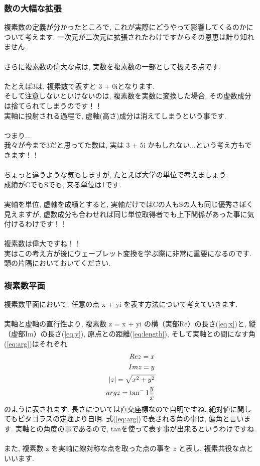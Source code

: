 \documentclass[11pt,a4paper]{jsarticle}
\begin{document}
\subsubsection{数の大幅な拡張}
複素数の定義が分かったところで, これが実際にどうやって影響してくるのかについて考えます. 一次元が二次元に拡張されたわけですからその恩恵は計り知れません. \\
\\
さらに複素数の偉大な点は, 実数を複素数の一部として扱える点です.\\
\\
たとえば3は, 複素数で表すと 3 + 0iとなります.\\
そして注意しないといけないのは, 複素数を実数に変換した場合, その虚数成分は捨てられてしまうのです！！\\
実軸に投射される過程で, 虚軸(高さ)成分は消えてしまうという事です.\\
\\
つまり...\\
我々が今まで3だと思ってた数は, 実は 3 + 5i かもしれない...という考え方もできます！！\\
\\
ちょっと違うような気もしますが, たとえば大学の単位で考えましょう.\\
成績がCでもSでも, 来る単位は1です.\\
\\
実軸を単位, 虚軸を成績とすると, 実軸だけではCの人もSの人も同じ優秀さぽく見えますが, 虚数成分も合わせれば同じ単位取得者でも上下関係があった事に気付けるわけです！！\\
\\
複素数は偉大ですね！！
\\
実はこの考え方が後にウェーブレット変換を学ぶ際に非常に重要になるのです. 頭の片隅においておいてください.\\

\subsubsection{複素数平面}
複素数平面において, 任意の点 x + yi を表す方法について考えていきます. \\
\\
実軸と虚軸の直行性より, 複素数 z = x + yi の横（実部Re）の長さ(\ref{eq:x})と, 縦（虚部Im）の長さ(\ref{eq:y}), 原点との距離(\ref{eq:length}), そして実軸との間になす角(\ref{eq:arg})はそれぞれ
\begin{eqnarray}
\mathstrut Re z = x
\label{eq:x}
\\
\mathstrut Im z = y
\label{eq:y}
\\
|z| = \sqrt{x^2 + y^2}
\label{eq:length}\\
\mathstrut arg z = \tan^-1 \frac{y}{x}
\label{eq:arg}
\end{eqnarray}
のように表されます. 長さについては直交座標なので自明ですね. 絶対値に関してもピタゴラスの定理より自明. 式(\ref{eq:arg})で表される角の事は, 偏角と言います. 実軸との角度の事であるので, tanを使って表す事が出来るというわけですね.\\
\\
また, 複素数 z を実軸に線対称な点を取った点の事を $ \overline{z}$ と表し, 複素共役な点といいます.\\
\end{document}
